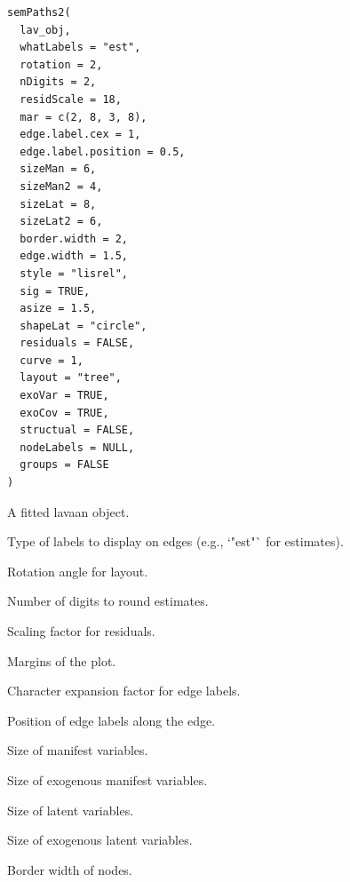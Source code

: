\documentclass[a4paper]{book}
\begin{document}
%
\begin{Usage}
\begin{verbatim}
semPaths2(
  lav_obj,
  whatLabels = "est",
  rotation = 2,
  nDigits = 2,
  residScale = 18,
  mar = c(2, 8, 3, 8),
  edge.label.cex = 1,
  edge.label.position = 0.5,
  sizeMan = 6,
  sizeMan2 = 4,
  sizeLat = 8,
  sizeLat2 = 6,
  border.width = 2,
  edge.width = 1.5,
  style = "lisrel",
  sig = TRUE,
  asize = 1.5,
  shapeLat = "circle",
  residuals = FALSE,
  curve = 1,
  layout = "tree",
  exoVar = TRUE,
  exoCov = TRUE,
  structual = FALSE,
  nodeLabels = NULL,
  groups = FALSE
)
\end{verbatim}
\end{Usage}
%
\begin{Arguments}
\begin{ldescription}
\item[\code{lav\_obj}] A fitted lavaan object.

\item[\code{whatLabels}] Type of labels to display on edges (e.g., `"est"` for estimates).

\item[\code{rotation}] Rotation angle for layout.

\item[\code{nDigits}] Number of digits to round estimates.

\item[\code{residScale}] Scaling factor for residuals.

\item[\code{mar}] Margins of the plot.

\item[\code{edge.label.cex}] Character expansion factor for edge labels.

\item[\code{edge.label.position}] Position of edge labels along the edge.

\item[\code{sizeMan}] Size of manifest variables.

\item[\code{sizeMan2}] Size of exogenous manifest variables.

\item[\code{sizeLat}] Size of latent variables.

\item[\code{sizeLat2}] Size of exogenous latent variables.

\item[\code{border.width}] Border width of nodes.


\end{ldescription}
\end{Arguments}
\end{document}
